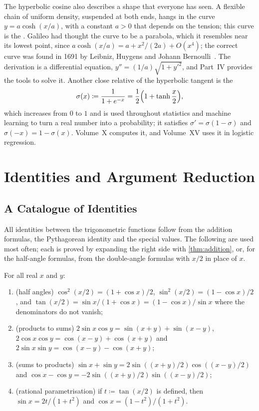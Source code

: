 The hyperbolic cosine also describes a shape that everyone has seen. A flexible chain of uniform density, suspended at both ends, hangs in the curve $y=a\cosh(x/a)$, with a constant $a>0$ that depends on the tension; this curve is the . Galileo had thought the curve to be a parabola, which it resembles near its lowest point, since $a\cosh(x/a)=a+x^2/(2a)+O(x^4)$; the correct curve was found in 1691 by Leibniz, Huygens and Johann Bernoulli~\cite{maor1994}. The derivation is a differential equation, $y''=(1/a)\sqrt{1+y'^2}$, and Part~IV provides the tools to solve it. Another close relative of the hyperbolic tangent is the 
\[
\sigma(x)\coloneqq\frac1{1+e^{-x}}=\frac12\Bigl(1+\tanh\frac x2\Bigr),
\]
which increases from $0$ to $1$ and is used throughout statistics and machine learning to turn a real number into a probability; it satisfies $\sigma'=\sigma(1-\sigma)$ and $\sigma(-x)=1-\sigma(x)$. Volume~X computes it, and Volume~XV uses it in logistic regression.

\section{Identities and Argument Reduction}
\label{sec:identities-reduction}

\subsection{A Catalogue of Identities}

All identities between the trigonometric functions follow from the addition formulas, the Pythagorean identity and the special values. The following are used most often; each is proved by expanding the right side with \cref{thm:addition}, or, for the half-angle formulas, from the double-angle formulas with $x/2$ in place of $x$.

\begin{proposition}
\label{prop:trig-identities}
For all real $x$ and $y$:
\begin{enumerate}
\item (half angles) $\cos^2(x/2)=(1+\cos x)/2$, $\sin^2(x/2)=(1-\cos x)/2$, and $\tan(x/2)=\sin x/(1+\cos x)=(1-\cos x)/\sin x$ where the denominators do not vanish;
\item (products to sums) $2\sin x\cos y=\sin(x+y)+\sin(x-y)$, $2\cos x\cos y=\cos(x-y)+\cos(x+y)$ and $2\sin x\sin y=\cos(x-y)-\cos(x+y)$;
\item (sums to products) $\sin x+\sin y=2\sin((x+y)/2)\cos((x-y)/2)$ and $\cos x-\cos y=-2\sin((x+y)/2)\sin((x-y)/2)$;
\item (rational parametrisation) if $t\coloneqq\tan(x/2)$ is defined, then $\sin x=2t/(1+t^2)$ and $\cos x=(1-t^2)/(1+t^2)$.
\end{enumerate}
\end{proposition}

